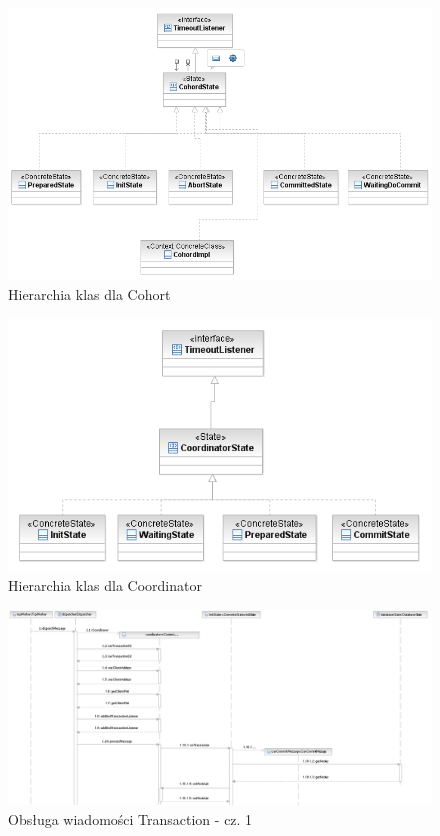\documentclass[a4paper, oneside, 11pt]{report}
\begin{document}
\begin{figure}[h]
\centering
\includegraphics[width=15cm]{sekwencje/CohCohordStates.png}
\caption{Hierarchia klas dla Cohort}
\end{figure}

\begin{figure}[h]
\centering
\includegraphics[width=15cm]{sekwencje/CorCoordinatorStates.png}
\caption{Hierarchia klas dla Coordinator}
\end{figure}

\begin{figure}[h]
\centering
\includegraphics[width=22cm,angle=90]{sekwencje/TransactionMessage1.png}
\caption{Obsługa wiadomości Transaction - cz. 1}
\end{figure}
\end{document}
